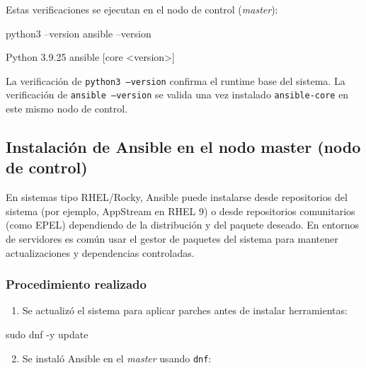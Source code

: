 Estas verificaciones se ejecutan en el nodo de control (\textit{master}):

\begin{terminalblock}
python3 --version
ansible --version
\end{terminalblock}

\begin{outputblock}
Python 3.9.25
ansible [core <version>]
\end{outputblock}

La verificación de \texttt{python3 --version} confirma el runtime base del sistema. La verificación de \texttt{ansible --version} se valida una vez instalado \texttt{ansible-core} en este mismo nodo de control.

\subsection{Instalación de Ansible en el nodo master (nodo de control)}
\label{subsec:ansible_install_master}

En sistemas tipo RHEL/Rocky, Ansible puede instalarse desde repositorios del sistema (por ejemplo, AppStream en RHEL 9) o desde repositorios comunitarios (como EPEL) dependiendo de la distribución y del paquete deseado. En entornos de servidores es común usar el gestor de paquetes del sistema para mantener actualizaciones y dependencias controladas. \cite{redhat_rhel9_ansible_core,ansible_installation_distros}

\subsubsection*{Procedimiento realizado}
\begin{enumerate}
  \item Se actualizó el sistema para aplicar parches antes de instalar herramientas:
\end{enumerate}

\begin{terminalblock}
sudo dnf -y update
\end{terminalblock}


\begin{enumerate}
  \setcounter{enumi}{1}
  \item Se instaló Ansible en el \textit{master} usando \texttt{dnf}:
\end{enumerate}


